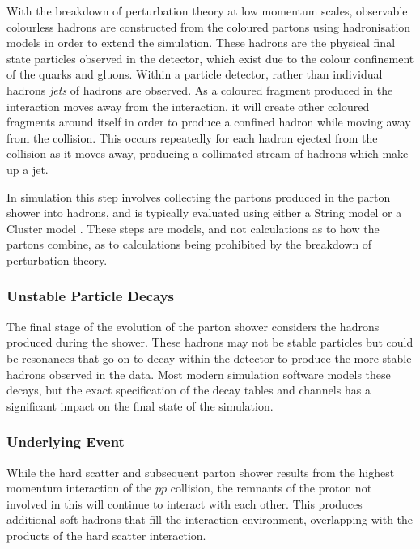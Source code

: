 			With the breakdown of perturbation theory at low momentum scales,  observable colourless hadrons are constructed from the coloured partons using hadronisation models in order to extend the simulation. These hadrons are the physical final state particles observed in the detector, which exist due to the colour confinement of the quarks and gluons. Within a particle detector, rather than individual hadrons \textit{jets} of hadrons are observed. As a coloured fragment produced in the interaction moves away from the interaction, it will create other coloured fragments around itself in order to produce a confined hadron while moving away from the collision. This occurs repeatedly for each hadron ejected from the collision as it moves away, producing a collimated stream of hadrons which make up a jet.

			In simulation this step involves collecting the partons produced in the parton shower into hadrons, and is typically evaluated using either a String model \cite{stringmodel} or a Cluster model \cite{clustermodel}. These steps are models, and not calculations as to how the partons combine, as to calculations being prohibited by the breakdown of perturbation theory.

		\subsubsection{Unstable Particle Decays}

			The final stage of the evolution of the parton shower considers the hadrons produced during the shower. These hadrons may not be stable particles but could be resonances that go on to decay within the detector to produce the more stable hadrons observed in the data. Most modern simulation software models these decays, but the exact specification of the decay tables and channels has a significant impact on the final state of the simulation.

		\subsubsection{Underlying Event}
		\label{t:underlying}

			While the hard scatter and subsequent parton shower results from the highest momentum interaction of the $pp$ collision, the remnants of the proton not involved in this will continue to interact with each other. This produces additional soft hadrons that fill the interaction environment, overlapping with the products of the hard scatter interaction.

